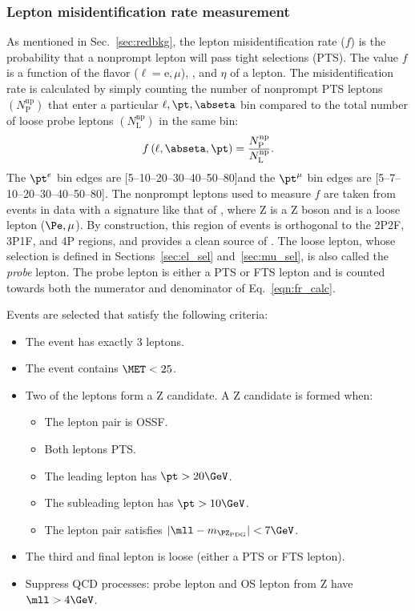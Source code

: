 \subsubsection{Lepton misidentification rate measurement}
\label{sec:fr_evtsel}
As mentioned in Sec.~\ref{sec:redbkg}, the lepton misidentification rate ($f$) is the probability that a nonprompt lepton will pass tight selections (PTS).
The value $f$ is a function of the flavor ($\ell = \text{e}, \mu$), \pt, and $\eta$ of a lepton.
The misidentification rate is calculated by simply counting the number of nonprompt PTS leptons $\left( N^{\mathrm{np}}_{\mathrm{P}} \right)$ that enter a particular $\ell, \pt, \abseta$ bin compared to the total number of loose probe leptons $\left( N^{\mathrm{np}}_{\mathrm{L}} \right)$ in the same bin:
\begin{equation}
	\label{eqn:fr_calc}
	f\left( \ell, \abseta, \pt \right) = 
	\frac{
		N^{\mathrm{np}}_{\mathrm{P}}
		}{
		N^{\mathrm{np}}_{\mathrm{L}}
		}.
\end{equation}
The $\pt^e$ bin edges are [5--10--20--30--40--50--80]\GeV and the $\pt^{\mu}$ bin edges are [5--7--10--20--30--40--50--80]\GeV.
The nonprompt leptons used to measure $f$ are taken from events in data with a signature like that of \ZplusL, where Z is a Z boson and \looselep is a loose lepton ($\Pe, \mu$).
By construction, this region of events is orthogonal to the 2P2F, 3P1F, and 4P regions, and provides a clean source of \looselep.
The loose lepton, whose selection is defined in Sections~\ref{sec:el_sel} and~\ref{sec:mu_sel}, is also called the \emph{probe} lepton.
The probe lepton is either a PTS or FTS lepton and is counted towards both the numerator and denominator of Eq.~\ref{eqn:fr_calc}. 

Events are selected that satisfy the following criteria:
\begin{itemize}
	\item The event has exactly 3 leptons.
	\item The event contains $\MET < 25$\GeV.
	\item Two of the leptons form a Z candidate. A Z candidate is formed when:
	\begin{itemize}
		\item The lepton pair is OSSF.
		\item Both leptons PTS.
		\item The leading lepton has $\pt > 20\GeV$.
		\item The subleading lepton has $\pt > 10\GeV$.
		\item The lepton pair satisfies $\left| \mll - m_{\PZ_{\text{PDG}}} \right| < 7\GeV$.
	\end{itemize}
	\item The third and final lepton is loose (\ie either a PTS or FTS lepton).
	\item Suppress QCD processes: probe lepton and OS lepton from Z have $\mll > 4\GeV$.
\end{itemize}

